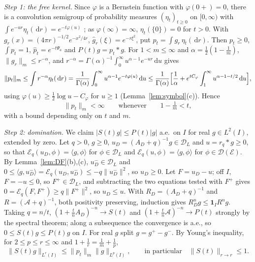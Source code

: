 \documentclass[11pt]{amsart}
\newcommand{\cE}{\mathcal{E}}
\newcommand{\one}{\mathbf{1}}
\newcommand{\dd}{\,\mathrm{d}}
\theoremstyle{definition}
\theoremstyle{remark}
\numberwithin{equation}{section}
\begin{document}
\emph{Step 1: the free kernel.} Since $\varphi$ is a Bernstein function with $\varphi(0+)=0$, there is a convolution semigroup of probability measures $(\eta_t)_{t\ge0}$ on $[0,\infty)$ with $\int e^{-ur}\eta_t(\dd r)=e^{-t\varphi(u)}$ \cite[Thm.~5.2]{SSV12}; as $\varphi(\infty)=\infty$, $\eta_t(\{0\})=0$ for $t>0$. With $g_r(x)=(4\pi r)^{-1/2}e^{-x^2/4r}$, $\hat g_r(\xi)=e^{-r\xi^2}$, put $p_t=\int g_r\,\eta_t(\dd r)$. Then $p_t\ge0$, $\int p_t=1$, $\hat p_t=e^{-t\Psi_a}$ and $P(t)g=p_t*g$. For $1<m\le\infty$ and $\alpha=\frac12(1-\frac1m)$, $\|g_r\|_m\le r^{-\alpha}$, and $r^{-\alpha}=\Gamma(\alpha)^{-1}\int_0^\infty u^{\alpha-1}e^{-ur}\dd u$ gives
\[
\|p_t\|_m\le\int r^{-\alpha}\eta_t(\dd r)=\frac1{\Gamma(\alpha)}\int_0^\infty u^{\alpha-1}e^{-t\varphi(u)}\dd u\le\frac1{\Gamma(\alpha)}\Bigl[\frac1\alpha+e^{tC_\varphi}\int_1^\infty u^{\alpha-1-t/2}\dd u\Bigr],
\]
using $\varphi(u)\ge\frac12\log u-C_\varphi$ for $u\ge1$ (Lemma~\ref{lem:symbol}(c)). Hence
\begin{equation}\label{eq:pt}
\|p_t\|_m<\infty\qquad\text{whenever}\qquad1-\tfrac1m<t,
\end{equation}
with a bound depending only on $t$ and $m$.

\emph{Step 2: domination.} We claim $|S(t)g|\le P(t)|g|$ a.e.\ on $I$ for real $g\in L^2(I)$, extended by zero. Let $q>0$, $g\ge0$, $u_D=(A_D+q)^{-1}g\in \mathcal D_L$ and $u=r_q*g\ge0$, so that $\cE_q(u_D,\phi)=\langle g,\phi\rangle$ for $\phi\in \mathcal D_L$ and $\cE_q(u,\phi)=\langle g,\phi\rangle$ for $\phi\in \mathcal D(\cE)$. By Lemma~\ref{lem:DF}(b),(c), $u_D^-\in \mathcal D_L$ and $0\le\langle g,u_D^-\rangle=\cE_q(u_D,u_D^-)\le-q\|u_D^-\|^2$, so $u_D\ge0$. Let $F=u_D-u$; off $I$, $F=-u\le0$, so $F^+\in \mathcal D_L$, and subtracting the two equations tested with $F^+$ gives $0=\cE_q(F,F^+)\ge q\|F^+\|^2$, so $u_D\le u$. With $R_D=(A_D+q)^{-1}$ and $R=(\mathcal A+q)^{-1}$, both positivity preserving, induction gives $R_D^ng\le\one_IR^ng$. Taking $q=n/t$, $(1+\frac tnA_D)^{-n}\to S(t)$ and $(1+\frac tn\mathcal A)^{-n}\to P(t)$ strongly by the spectral theorem; along a subsequence the convergence is a.e., so $0\le S(t)g\le P(t)g$ on $I$. For real $g$ split $g=g^+-g^-$. By Young's inequality, for $2\le p\le r\le\infty$ and $1+\frac1r=\frac1m+\frac1p$,
\begin{equation}\label{eq:smooth}
\|S(t)g\|_{L^r(I)}\le\|p_t\|_m\|g\|_{L^p(I)},\qquad\text{in particular}\quad\|S(t)\|_{r\to r}\le1 .
\end{equation}
\end{document}
